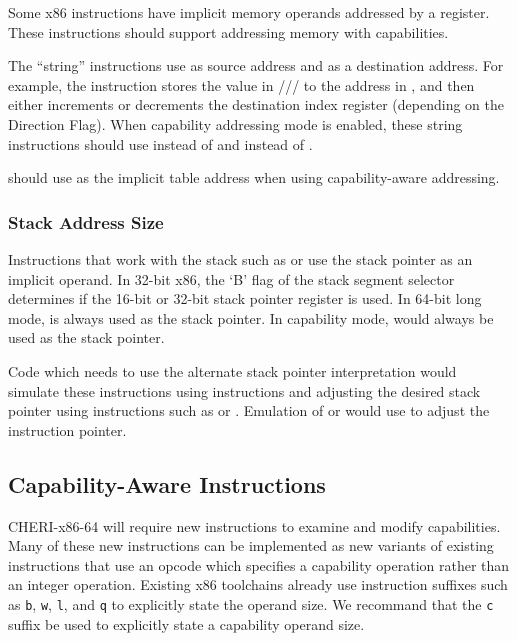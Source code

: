 Some x86 instructions have implicit memory operands addressed by a
register.  These instructions should support addressing memory with
capabilities.

The ``string''
instructions use \RSI{} as source address and \RDI{} as a destination address.
For example, the
 instruction stores the value in \AL{}/\AX{}/\EAX{}/\RAX{} to the address in
\RDI{}, and then either increments or decrements the destination
index register (depending on the Direction Flag).  When capability
addressing mode is enabled,
these string instructions should use \CSI{} instead of \RSI{} and \CDI{} instead of
\RDI{}.

 should use \CBX{} as the implicit table address when
using capability-aware addressing.

\subsubsection{Stack Address Size}

Instructions that work with the stack such as  or
 use the stack pointer as an implicit operand.  In
32-bit x86, the `B' flag of the stack segment selector determines if
the 16-bit or 32-bit stack pointer register is used.  In 64-bit long
mode, \RSP{} is always used as the stack pointer.  In capability mode,
\CSP{} would always be used as the stack pointer.

Code which needs to use the alternate stack pointer
interpretation would simulate these instructions using 
instructions and adjusting the desired stack pointer using
instructions such as  or .  Emulation of
 or  would use  to
adjust the instruction pointer.

\subsection{Capability-Aware Instructions}

CHERI-x86-64 will require new instructions to examine and modify
capabilities.  Many of these new instructions can be implemented as
new variants of existing instructions that use an opcode which
specifies a capability operation rather than an integer operation.
Existing x86 toolchains already use instruction suffixes such as
\texttt{b}, \texttt{w}, \texttt{l}, and \texttt{q} to explicitly state
the operand size.  We recommand that the \texttt{c} suffix be used to
explicitly state a capability operand size.

